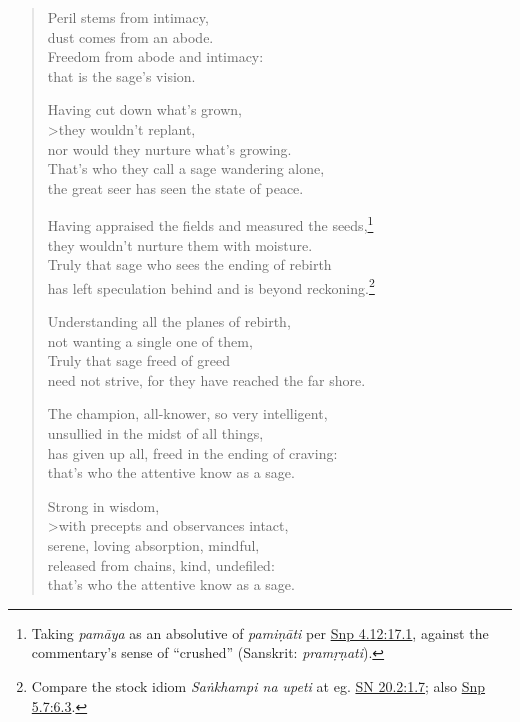\documentclass[12pt,openany]{book}%
\begin{document}
\begin{verse}%
Peril stems from intimacy, \\
dust comes from an abode. \\
Freedom from abode and intimacy: \\
that is the sage’s vision. 

Having cut down what’s grown, \\>they wouldn’t replant, \\
nor would they nurture what’s growing. \\
That’s who they call a sage wandering alone, \\
the great seer has seen the state of peace. 

Having appraised the fields and measured the seeds,\footnote{Taking \textit{\textsanskrit{pamāya}} as an absolutive of \textit{\textsanskrit{pamiṇāti}} per \href{https://suttacentral.net/snp4.12/en/sujato\#17.1}{Snp 4.12:17.1}, against the commentary’s sense of “crushed” (Sanskrit: \textit{\textsanskrit{pramṛṇati}}). } \\
they wouldn’t nurture them with moisture. \\
Truly that sage who sees the ending of rebirth \\
has left speculation behind and is beyond reckoning.\footnote{Compare the stock idiom \textit{\textsanskrit{Saṅkhampi} na upeti} at eg. \href{https://suttacentral.net/sn20.2/en/sujato\#1.7}{SN 20.2:1.7}; also \href{https://suttacentral.net/snp5.7/en/sujato\#6.3}{Snp 5.7:6.3}. } 

Understanding all the planes of rebirth, \\
not wanting a single one of them, \\
Truly that sage freed of greed \\
need not strive, for they have reached the far shore. 

The champion, all-knower, so very intelligent, \\
unsullied in the midst of all things, \\
has given up all, freed in the ending of craving: \\
that’s who the attentive know as a sage. 

Strong in wisdom, \\>with precepts and observances intact, \\
serene, loving absorption, mindful, \\
released from chains, kind, undefiled: \\
that’s who the attentive know as a sage. 


\end{verse}
\end{document}
